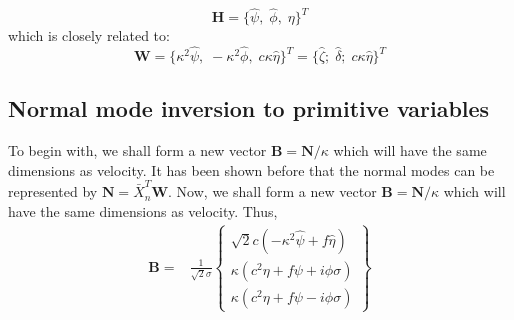 \documentclass[a4paper,12pt]{paper}
\begin{document}
$$\mathbf{H} = \{\hat \psi,\; \hat \phi,\;  \eta  \}^T$$
which is closely related to:
$$\mathbf{W} 
= \{\kappa^2\hat \psi,\; -\kappa^2\hat 
\phi,\; c\kappa\hat \eta  \}^T 
= \{\hat \zeta;\; \hat \delta;\;  c\kappa \hat \eta \}^T $$

\subsection{Normal mode inversion to primitive variables}
To begin with, we shall form a new vector $\mathbf{B} = \mathbf{N}/\kappa$ 
which will have the same dimensions as velocity.
It has been shown before that the normal modes can be represented by $\mathbf{N} 
= \bar{X}_n^T \mathbf{W}$. Now,  we shall form a new vector $\mathbf{B} = 
\mathbf{N}/\kappa$ which will have the same dimensions as velocity. Thus,
\begin{align}
   \mathbf{B}
   = &\frac{1}{\sqrt{2}\sigma}
    \begin{Bmatrix} \sqrt{2} c\left(- 
    \kappa^{2} \hat \psi +  f\hat\eta \right)\\
    \kappa \left(c^{2} \eta + f \psi + i \phi \sigma\right)\\
    \kappa \left(c^{2} \eta + f \psi - i \phi \sigma\right)
    \end{Bmatrix}
\end{align}
\end{document}
